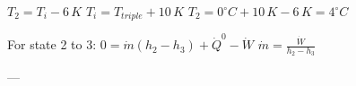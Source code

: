 \( T_2 = T_i - 6 \, K \)  
\( T_i = T_{triple} + 10 \, K \)  
\( T_2 = 0^\circ C + 10 \, K - 6 \, K = 4^\circ C \)  

For state 2 to 3:  
\( 0 = \dot{m} (h_2 - h_3) + \dot{Q}^0 - \dot{W} \)  
\( \dot{m} = \frac{\dot{W}}{h_2 - h_3} \)  

---